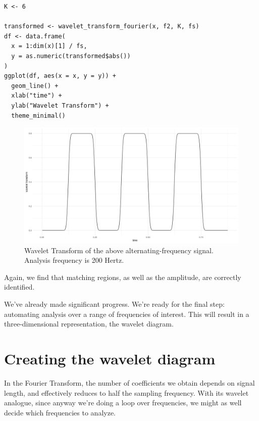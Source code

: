 \documentclass[
  letterpaper,
]{krantz}
\begin{document}
\begin{verbatim}
K <- 6

transformed <- wavelet_transform_fourier(x, f2, K, fs)
df <- data.frame(
  x = 1:dim(x)[1] / fs,
  y = as.numeric(transformed$abs())
)
ggplot(df, aes(x = x, y = y)) +
  geom_line() +
  xlab("time") +
  ylab("Wavelet Transform") +
  theme_minimal()
\end{verbatim}

\begin{figure}[H]

{\centering \includegraphics{images/wav-example-long-transform2.png}

}

\caption{\label{fig-wav-example-long-transform2}Wavelet Transform of the
above alternating-frequency signal. Analysis frequency is 200 Hertz.}

\end{figure}

Again, we find that matching regions, as well as the amplitude, are
correctly identified.

We've already made significant progress. We're ready for the final step:
automating analysis over a range of frequencies of interest. This will
result in a three-dimensional representation, the wavelet diagram.

\hypertarget{creating-the-wavelet-diagram}{%
\section{\texorpdfstring{Creating the wavelet
diagram}{Creating the wavelet diagram}}\label{creating-the-wavelet-diagram}}

In the Fourier Transform, the number of coefficients we obtain depends
on signal length, and effectively reduces to half the sampling
frequency. With its wavelet analogue, since anyway we're doing a loop
over frequencies, we might as well decide which frequencies to analyze.
\end{document}

